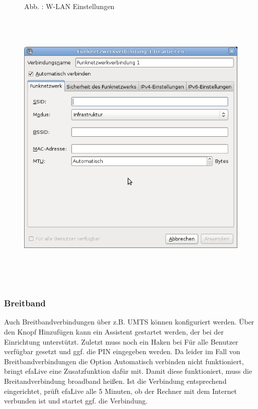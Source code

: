 \documentclass[a4paper,12pt,twoside]{article}
\newcounter{Abb}
\renewcommand\theAbb{\arabic{Abb}}
\begin{document}
\bigskip



\begin{figure}
\centering
\begin{minipage}{11.072cm}
Abb. \stepcounter{Abb}{\theAbb}: W-LAN Einstellungen
\includegraphics[width=15.187cm,height=14.314cm]{efaLivede-img/efaLivede-img24.png}\end{minipage}
\end{figure}
\subsubsection{Breitband}
Auch Breitbandverbindungen über z.B. UMTS können konfiguriert werden.
Über den Knopf {\textquotedbl}Hinzufügen{\textquotedbl} kann ein
Assistent gestartet werden, der bei der Einrichtung unterstützt.
Zuletzt muss noch ein Haken bei {\textquotedbl}Für alle Benutzer
verfügbar{\textquotedbl} gesetzt und ggf. die PIN eingegeben werden. Da
leider im Fall von Breitbandverbindungen die Option
{\textquotedbl}Automatisch verbinden{\textquotedbl} nicht funktioniert,
bringt efaLive eine Zusatzfunktion dafür mit. Damit diese funktioniert,
muss die Breitandverbindung {\textquotedbl}broadband{\textquotedbl}
heißen. Ist die Verbindung entsprechend eingerichtet, prüft efaLive
alle 5 Minuten, ob der Rechner mit dem Internet verbunden ist und
startet ggf. die Verbindung.
\end{document}
